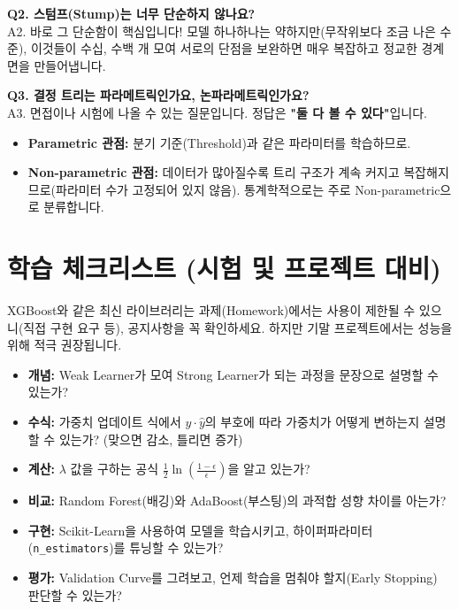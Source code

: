 \documentclass[11pt,a4paper]{book}
\theoremstyle{definition}
\begin{document}
\textbf{Q2. 스텀프(Stump)는 너무 단순하지 않나요?} \\
A2. 바로 그 단순함이 핵심입니다! 모델 하나하나는 약하지만(무작위보다 조금 나은 수준), 이것들이 수십, 수백 개 모여 서로의 단점을 보완하면 매우 복잡하고 정교한 경계면을 만들어냅니다.

\textbf{Q3. 결정 트리는 파라메트릭인가요, 논파라메트릭인가요?} \\
A3. 면접이나 시험에 나올 수 있는 질문입니다. 정답은 \textbf{"둘 다 볼 수 있다"}입니다.
\begin{itemize}
    \item \textbf{Parametric 관점:} 분기 기준(Threshold)과 같은 파라미터를 학습하므로.
    \item \textbf{Non-parametric 관점:} 데이터가 많아질수록 트리 구조가 계속 커지고 복잡해지므로(파라미터 수가 고정되어 있지 않음). 통계학적으로는 주로 Non-parametric으로 분류합니다.
\end{itemize}


\section{학습 체크리스트 (시험 및 프로젝트 대비)}

\begin{warningbox}[title={과제/프로젝트 주의사항}]
XGBoost와 같은 최신 라이브러리는 과제(Homework)에서는 사용이 제한될 수 있으니(직접 구현 요구 등), 공지사항을 꼭 확인하세요. 하지만 기말 프로젝트에서는 성능을 위해 적극 권장됩니다.
\end{warningbox}

\begin{itemize}[label=$\square$]
    \item \textbf{개념:} Weak Learner가 모여 Strong Learner가 되는 과정을 문장으로 설명할 수 있는가?
    \item \textbf{수식:} 가중치 업데이트 식에서 $y \cdot \hat{y}$의 부호에 따라 가중치가 어떻게 변하는지 설명할 수 있는가? (맞으면 감소, 틀리면 증가)
    \item \textbf{계산:} $\lambda$ 값을 구하는 공식 $\frac{1}{2} \ln(\frac{1-\epsilon}{\epsilon})$을 알고 있는가?
    \item \textbf{비교:} Random Forest(배깅)와 AdaBoost(부스팅)의 과적합 성향 차이를 아는가?
    \item \textbf{구현:} Scikit-Learn을 사용하여 모델을 학습시키고, 하이퍼파라미터(\texttt{n\_estimators})를 튜닝할 수 있는가?
    \item \textbf{평가:} Validation Curve를 그려보고, 언제 학습을 멈춰야 할지(Early Stopping) 판단할 수 있는가?
\end{itemize}
\end{document}
